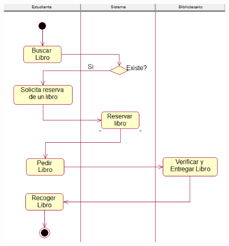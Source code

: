 \begin{enumerate}[1.]
\begin{center}
	\includegraphics[width=12cm]{./Imagenes/img6} 
	\end{center}
	
\end{enumerate} 

